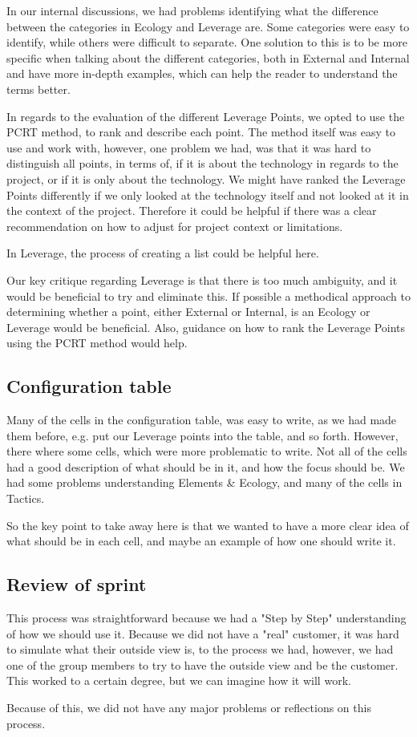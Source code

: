 In our internal discussions, we had problems identifying what the difference between the categories in Ecology and Leverage are.
Some categories were easy to identify, while others were difficult to separate.
One solution to this is to be more specific when talking about the different categories, both in External and Internal and have more in-depth examples, which can help the reader to understand the terms better.

In regards to the evaluation of the different Leverage Points, we opted to use the PCRT method, to rank and describe each point.
The method itself was easy to use and work with, however, one problem we had, was that it was hard to distinguish all points, in terms of, if it is about the technology in regards to the project, or if it is only about the technology.
We might have ranked the Leverage Points differently if we only looked at the technology itself and not looked at it in the context of the project.
Therefore it could be helpful if there was a clear recommendation on how to adjust for project context or limitations.

In Leverage, the process of creating a list could be helpful here.

Our key critique regarding Leverage is that there is too much ambiguity, and it would be beneficial to try and eliminate this. 
If possible a methodical approach to determining whether a point, either External or Internal, is an Ecology or Leverage would be beneficial.
Also, guidance on how to rank the Leverage Points using the PCRT method would help.

\subsection{Configuration table}
Many of the cells in the configuration table, was easy to write, as we had made them before, e.g. put our Leverage points into the table, and so forth.
However, there where some cells, which were more problematic to write.
Not all of the cells had a good description of what should be in it, and how the focus should be.
We had some problems understanding Elements \& Ecology, and many of the cells in Tactics.

So the key point to take away here is that we wanted to have a more clear idea of what should be in each cell, and maybe an example of how one should write it.

\subsection{Review of sprint}
This process was straightforward because we had a "Step by Step" understanding of how we should use it.
Because we did not have a "real" customer, it was hard to simulate what their outside view is, to the process we had, however, we had one of the group members to try to have the outside view and be the customer.
This worked to a certain degree, but we can imagine how it will work.

Because of this, we did not have any major problems or reflections on this process.
